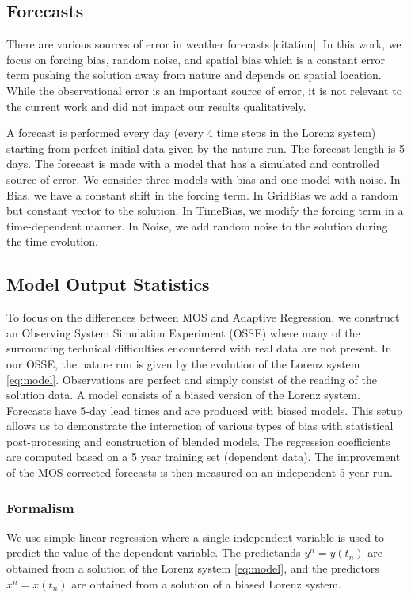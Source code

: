 \documentclass[10pt]{article}
\begin{document}
\subsection{Forecasts}
There are various sources of error in weather forecasts [citation]. In this work, we focus on forcing bias, random noise, and spatial bias which is a constant error term pushing the solution away from nature and depends on spatial location. While the observational error is an important source of error, it is not relevant to the current work and did not impact our results qualitatively.

A forecast is performed every day (every 4 time steps in the Lorenz system) starting from perfect initial data given by the nature run. The forecast length is 5 days. The forecast is made with a model that has a simulated and controlled source of error. We consider three models with bias and one model with noise. In Bias, we have a constant shift in the forcing term. In GridBias we add a random but constant vector to the solution. In TimeBias, we modify the forcing term in a time-dependent manner. In Noise, we add random noise to the solution during the time evolution.

\subsection{Model Output Statistics}
To focus on the differences between MOS and Adaptive Regression, we construct an Observing System Simulation Experiment (OSSE) where many of the surrounding technical difficulties encountered with real data are not present. In our OSSE, the nature run is given by the evolution of the Lorenz system \eqref{eq:model}. Observations are perfect and simply consist of the reading of the solution data. A model consists of a biased version of the Lorenz system. Forecasts have 5-day lead times and are produced with biased models. This setup allows us to demonstrate the interaction of various types of bias with statistical post-processing and construction of blended models. The regression coefficients are computed based on a 5 year training set (dependent data). The improvement of the MOS corrected forecasts is then measured on an independent 5 year run.

\subsubsection{Formalism}

We use simple linear regression where a single independent variable is used to predict the value of the dependent variable. The predictands $y^n=y(t_n)$ are obtained from a solution of the Lorenz system \eqref{eq:model}, and the predictors $x^n=x(t_n)$ are obtained from a solution of a biased Lorenz system.
\end{document}
